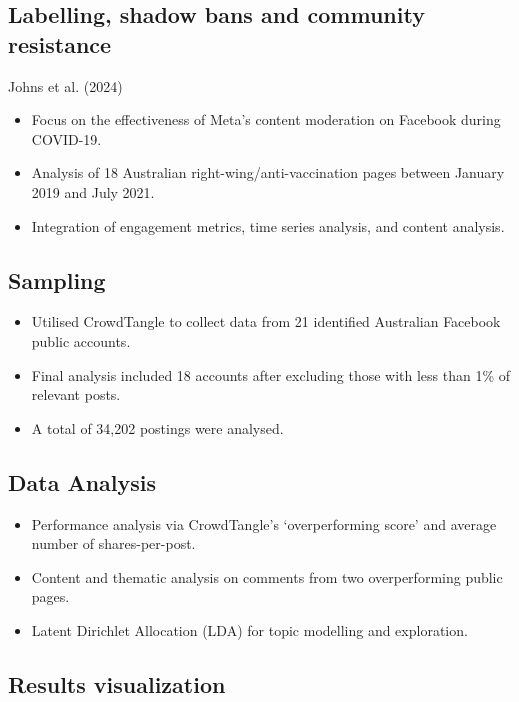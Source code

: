 \documentclass[
  letterpaper,
  DIV=11,
  numbers=noendperiod]{scrartcl}
\providecommand{\tightlist}{%
  \setlength{\itemsep}{0pt}\setlength{\parskip}{0pt}}
\begin{document}
\subsection{Labelling, shadow bans and community
resistance}\label{labelling-shadow-bans-and-community-resistance}

Johns et al. (2024)

\begin{itemize}
\tightlist
\item
  Focus on the effectiveness of Meta's content moderation on Facebook
  during COVID-19.
\item
  Analysis of 18 Australian right-wing/anti-vaccination pages between
  January 2019 and July 2021.
\item
  Integration of engagement metrics, time series analysis, and content
  analysis.
\end{itemize}

\subsection{Sampling}\label{sampling}

\begin{itemize}
\tightlist
\item
  Utilised CrowdTangle to collect data from 21 identified Australian
  Facebook public accounts.
\item
  Final analysis included 18 accounts after excluding those with less
  than 1\% of relevant posts.
\item
  A total of 34,202 postings were analysed.
\end{itemize}

\subsection{Data Analysis}\label{data-analysis}

\begin{itemize}
\tightlist
\item
  Performance analysis via CrowdTangle's `overperforming score' and
  average number of shares-per-post.
\item
  Content and thematic analysis on comments from two overperforming
  public pages.
\item
  Latent Dirichlet Allocation (LDA) for topic modelling and exploration.
\end{itemize}

\subsection{Results visualization}\label{results-visualization}
\end{document}
